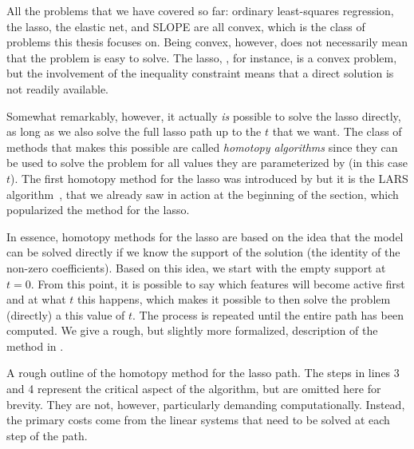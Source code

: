 All the problems that we have covered so far: ordinary least-squares regression, the lasso, the elastic net, and SLOPE are all convex, which is the class of problems this thesis focuses on. Being convex, however, does not necessarily mean that the problem is easy to solve. The lasso, , for instance, is a convex problem, but the involvement of the inequality constraint means that a direct solution is not readily available.

Somewhat remarkably, however, it actually \emph{is} possible to solve the lasso directly, as long as we also solve the full lasso path up to the \(t\) that we want. The class of methods that makes this possible are called \emph{homotopy algorithms} since they can be used to solve the problem for all values they are parameterized by (in this case \(t\)). The first homotopy method for the lasso was introduced by \textcite{osborne2000,osborne2000a} but it is the LARS algorithm~\parencite{efron2004}, that we already saw in action at the beginning of the section, which popularized the method for the lasso.

In essence, homotopy methods for the lasso are based on the idea that the model can be solved directly if we know the support of the solution (the identity of the non-zero coefficients). Based on this idea, we start with the empty support at \(t=0\). From this point, it is possible to say which features will become active first and at what \(t\) this happens, which makes it possible to then solve the problem (directly) a this value of \(t\). The process is repeated until the entire path has been computed. We give a rough, but slightly more formalized, description of the method in .

\begin{algorithm}
  \caption{A rough outline of the homotopy method for the lasso path. The steps in lines 3 and 4 represent the critical aspect of the algorithm, but are omitted here for brevity. They are not, however, particularly demanding computationally. Instead, the primary costs come from the linear systems that need to be solved at each step of the path.}
  \label{alg:homotopy}
\end{algorithm}

